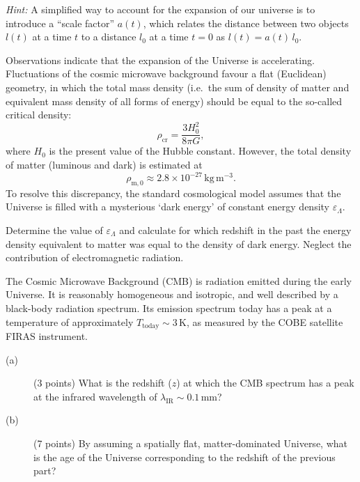 \emph{Hint:} A simplified way to account for the expansion of our universe is
to introduce a ``scale factor'' $a(t)$, which relates the distance between two
objects $l(t)$ at a time $t$ to a distance $l_0$ at a time $t = 0$ as
$l(t) = a(t)\,l_0$.

Observations indicate that the expansion of the Universe is accelerating.
Fluctuations of the cosmic microwave background favour a flat (Euclidean)
geometry, in which the total mass density (i.e.\ the sum of density of matter
and equivalent mass density of all forms of energy) should be equal to the
so-called critical density:
\[ \rho_{\mathrm{cr}} = \frac{3H_0^2}{8\pi G}, \]
where $H_0$ is the present value of the Hubble constant. However, the total
density of matter (luminous and dark) is estimated at
\[ \rho_{\mathrm{m},0} \approx 2.8 \times 10^{-27}\,\mathrm{kg\,m^{-3}}. \]
To resolve this discrepancy, the standard cosmological model assumes that the
Universe is filled with a mysterious `dark energy' of constant energy density
$\varepsilon_\Lambda$.

Determine the value of $\varepsilon_\Lambda$ and calculate for which redshift
in the past the energy density equivalent to matter was equal to the density
of dark energy. Neglect the contribution of electromagnetic radiation.

The Cosmic Microwave Background (CMB) is radiation emitted during the early
Universe. It is reasonably homogeneous and isotropic, and well described by a
black-body radiation spectrum. Its emission spectrum today has a peak at a
temperature of approximately $T_{\mathrm{today}} \sim 3$\,K, as measured by
the COBE satellite FIRAS instrument.

\begin{description}
\item[(a)] (3 points) What is the redshift ($z$) at which the CMB spectrum has
  a peak at the infrared wavelength of
  $\lambda_{\mathrm{IR}} \sim 0.1$\,mm?
\item[(b)] (7 points) By assuming a spatially flat, matter-dominated Universe,
  what is the age of the Universe corresponding to the redshift of the
  previous part?
\end{description}

